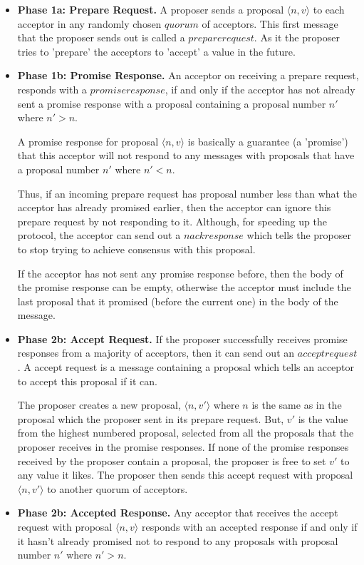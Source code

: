 \begin{itemize}
  \item \textbf{Phase 1a: Prepare Request.}
    A proposer sends a proposal
    $\langle n, v \rangle$ to each acceptor in any randomly chosen $quorum$ of acceptors.
    This first message that the proposer sends out is called a $prepare request$.
    As it the proposer tries to 'prepare' the acceptors to 'accept' a value in the future.
  \item \textbf{Phase 1b: Promise Response.}
    An acceptor on receiving a prepare request, responds with a $promise response$,
    if and only if the acceptor has not already sent a promise response with
    a proposal containing a proposal number $n'$ where $n' > n$.

    A promise response for proposal $\langle n, v \rangle$ is basically a
    guarantee (a 'promise') that this acceptor will not respond to any
    messages with proposals that have a proposal number $n'$ where $n' < n$.

    Thus, if an incoming prepare request has proposal number less than what the
    acceptor has already promised earlier, then the acceptor can ignore this
    prepare request by not responding to it. Although, for speeding up the
    protocol, the acceptor can send out a $nack response$ which tells the
    proposer to stop trying to achieve consensus with this proposal.

    If the acceptor has not sent any promise response before, then the body of
    the promise response can be empty, otherwise the acceptor must include the
    last proposal that it promised (before the current one) in the body of the
    message.
  \item \textbf{Phase 2b: Accept Request.}
    If the proposer successfully receives promise responses from a majority of
    acceptors, then it can send out an $accept request$. A accept request is
    a message containing a proposal which tells an acceptor to accept this
    proposal if it can.

    The proposer creates a new proposal, $\langle n, v' \rangle$ where $n$ is
    the same as in the proposal which the proposer sent in its prepare request.
    But, $v'$ is the value from the highest numbered proposal, selected from all
    the proposals that the proposer receives in the promise responses.
    If none of the promise responses received by the proposer contain a proposal,
    the proposer is free to set $v'$ to any value it likes.
    The proposer then sends this accept request with proposal $\langle n, v' \rangle$
    to another quorum of acceptors.
  \item \textbf{Phase 2b: Accepted Response.}
    Any acceptor that receives the accept request with proposal $\langle n, v \rangle$
    responds with an accepted response if and only if it hasn't already promised
    not to respond to any proposals with proposal number $n'$ where $n' > n$.
\end{itemize}

